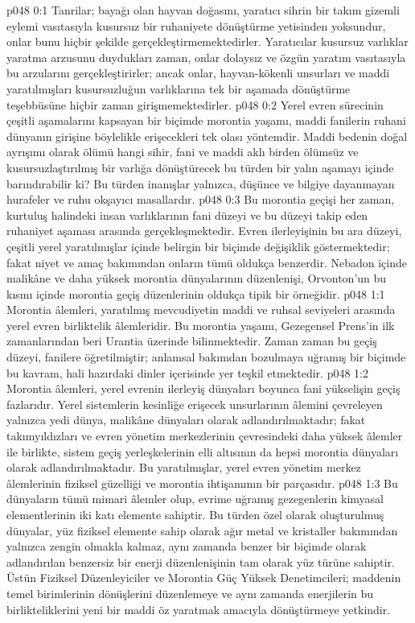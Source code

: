 \vs p048 0:1 Tanrilar; bayağı olan hayvan doğasını, yaratıcı sihrin bir takım gizemli eylemi vasıtasıyla kusursuz bir ruhaniyete dönüştürme yetisinden yoksundur, onlar bunu hiçbir şekilde gerçekleştirmemektedirler. Yaratıcılar kusursuz varlıklar yaratma arzusunu duydukları zaman, onlar dolaysız ve özgün yaratım vasıtasıyla bu arzularını gerçekleştirirler; ancak onlar, hayvan\hyp{}kökenli unsurları ve maddi yaratılmışları kusursuzluğun varlıklarına tek bir aşamada dönüştürme teşebbüsüne hiçbir zaman girişmemektedirler.
\vs p048 0:2 Yerel evren sürecinin çeşitli aşamalarını kapsayan bir biçimde morontia yaşamı, maddi fanilerin ruhani dünyanın girişine böylelikle erişecekleri tek olası yöntemdir. Maddi bedenin doğal ayrışımı olarak ölümü hangi sihir, fani ve maddi aklı birden ölümsüz ve kusursuzlaştırılmış bir varlığa dönüştürecek bu türden bir yalın aşamayı içinde barındırabilir ki? Bu türden inanışlar yalnızca, düşünce ve bilgiye dayanmayan hurafeler ve ruhu okşayıcı masallardır.
\vs p048 0:3 Bu morontia geçişi her zaman, kurtuluş halindeki insan varlıklarının fani düzeyi ve bu düzeyi takip eden ruhaniyet aşaması arasında gerçekleşmektedir. Evren ilerleyişinin bu ara düzeyi, çeşitli yerel yaratılmışlar içinde belirgin bir biçimde değişiklik göstermektedir; fakat niyet ve amaç bakımından onların tümü oldukça benzerdir. Nebadon içinde malikâne ve daha yüksek morontia dünyalarının düzenlenişi, Orvonton’un bu kısmı içinde morontia geçiş düzenlerinin oldukça tipik bir örneğidir.
\vs p048 1:1 Morontia âlemleri, yaratılmış mevcudiyetin maddi ve ruhsal seviyeleri arasında yerel evren birliktelik âlemleridir. Bu morontia yaşamı, Gezegensel Prens’in ilk zamanlarından beri Urantia üzerinde bilinmektedir. Zaman zaman bu geçiş düzeyi, fanilere öğretilmiştir; anlamsal bakımdan bozulmaya uğramış bir biçimde bu kavram, hali hazırdaki dinler içerisinde yer teşkil etmektedir.
\vs p048 1:2 Morontia âlemleri, yerel evrenin ilerleyiş dünyaları boyunca fani yükselişin geçiş fazlarıdır. Yerel sistemlerin kesinliğe erişecek unsurlarının âlemini çevreleyen yalnızca yedi dünya, malikâne dünyaları olarak adlandırılmaktadır; fakat takımyıldızları ve evren yönetim merkezlerinin çevresindeki daha yüksek âlemler ile birlikte, sistem geçiş yerleşkelerinin elli altısının da hepsi morontia dünyaları olarak adlandırılmaktadır. Bu yaratılmışlar, yerel evren yönetim merkez âlemlerinin fiziksel güzelliği ve morontia ihtişamının bir parçasıdır.
\vs p048 1:3 Bu dünyaların tümü mimari âlemler olup, evrime uğramış gezegenlerin kimyasal elementlerinin iki katı elemente sahiptir. Bu türden özel olarak oluşturulmuş dünyalar, yüz fiziksel elemente sahip olarak ağır metal ve kristaller bakımından yalnızca zengin olmakla kalmaz, aynı zamanda benzer bir biçimde  olarak adlandırılan benzersiz bir enerji düzenlenişinin tam olarak yüz türüne sahiptir. Üstün Fiziksel Düzenleyiciler ve Morontia Güç Yüksek Denetimcileri; maddenin temel birimlerinin dönüşlerini düzenlemeye ve aynı zamanda enerjilerin bu birlikteliklerini yeni bir maddi öz yaratmak amacıyla dönüştürmeye yetkindir.
